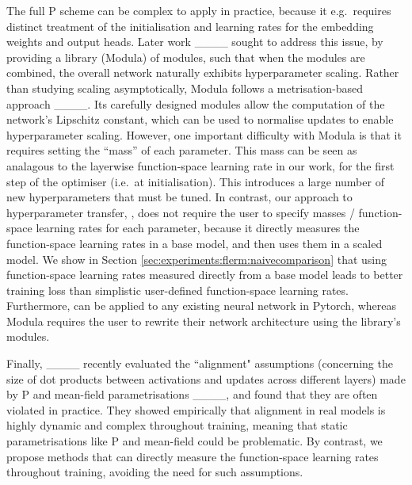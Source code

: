 The full \textmu{}P scheme can be complex to apply in practice, because it e.g.\ requires distinct treatment of the initialisation and learning rates for the embedding weights and output heads.
Later work ____ sought to address this issue, by providing a library (Modula) of modules, such that when the modules are combined, the overall network naturally exhibits hyperparameter scaling. Rather than studying scaling asymptotically, Modula follows a metrisation-based approach ____. Its carefully designed modules allow the computation of the network's Lipschitz constant, which can be used to normalise updates to enable hyperparameter scaling.
However, one important difficulty with Modula is that it requires setting the ``mass'' of each parameter.
This mass can be seen as analagous to the layerwise function-space learning rate in our work, for the first step of the optimiser (i.e.\ at initialisation).
This introduces a large number of new hyperparameters that must be tuned.
In contrast, our approach to hyperparameter transfer, \flerm{}, does not require the user to specify masses / function-space learning rates for each parameter, because it directly measures the function-space learning rates in a base model, and then uses them in a scaled model. We show in Section \ref{sec:experiments:flerm:naivecomparison} that using function-space learning rates measured directly from a base model leads to better training loss than simplistic user-defined function-space learning rates.
Furthermore, \flerm{} can be applied to any existing neural network in Pytorch, whereas Modula requires the user to rewrite their network architecture using the library's modules.

Finally, ____ recently evaluated the ``alignment" assumptions (concerning the size of dot products between activations and updates across different layers) made by \textmu{}P and mean-field parametrisations ____, and found that they are often violated in practice. They showed empirically that alignment in real models is highly dynamic and complex throughout training, meaning that static parametrisations like \textmu{}P and mean-field could be problematic.
By contrast, we propose methods that can directly measure the function-space learning rates throughout training, avoiding the need for such assumptions.
